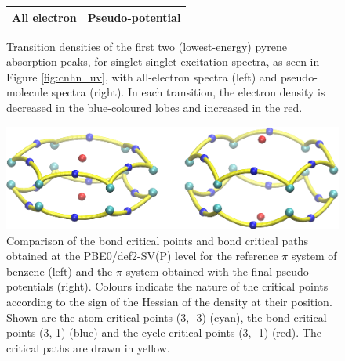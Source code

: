 \documentclass[12pt]{article}
\begin{document}
\begin{figure}
\begin{tabular}{|c|c|}
\hline
All electron & Pseudo-potential\\
\hline
\end{tabular}
\caption{Transition densities of the first two (lowest-energy) pyrene absorption peaks, for singlet-singlet excitation spectra, as seen in Figure \ref{fig:cnhn_uv}, with all-electron spectra (left) and pseudo-molecule spectra (right). In each transition, the electron density is decreased in the blue-coloured lobes and increased in the red.}
\label{fig:transitiondensities}
\end{figure}

\begin{figure}
\begin{center}
\includegraphics[width=12cm]{aim_c6h6.eps}
\end{center}
\vspace{0.25in}
\hspace*{3in}
\caption{Comparison of the bond critical points and bond critical paths obtained at the PBE0/def2-SV(P)
level for the
reference $\pi$ system of benzene (left) and the $\pi$ system obtained with the final pseudo-potentials (right). Colours indicate the nature of the critical points according to the sign of the Hessian
of the density at their position. Shown are the atom critical points (3, -3) (cyan), the bond critical points (3, 1) (blue) and the cycle critical points (3, -1) (red). The critical paths are drawn in yellow.}
\label{fig:aim_c6h6}
\end{figure}

\clearpage
\end{document}
